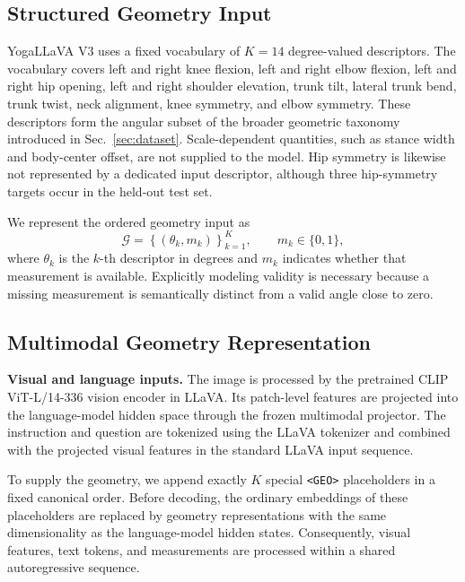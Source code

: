 \subsection{Structured Geometry Input}
\label{sec:structured_geometry_input}

YogaLLaVA V3 uses a fixed vocabulary of $K=14$ degree-valued descriptors.
The vocabulary covers left and right knee flexion, left and right elbow flexion, left and right hip opening, left and right shoulder elevation, trunk tilt, lateral trunk bend, trunk twist, neck alignment, knee symmetry, and elbow symmetry.
These descriptors form the angular subset of the broader geometric taxonomy introduced in Sec.~\ref{sec:dataset}.
Scale-dependent quantities, such as stance width and body-center offset, are not supplied to the model.
Hip symmetry is likewise not represented by a dedicated input descriptor, although three hip-symmetry targets occur in the held-out test set.

We represent the ordered geometry input as
\begin{equation}
    \mathcal{G}
    =
    \left\{(\theta_k,m_k)\right\}_{k=1}^{K},
    \qquad m_k\in\{0,1\},
    \label{eq:geometry_input}
\end{equation}
where $\theta_k$ is the $k$-th descriptor in degrees and $m_k$ indicates whether that measurement is available.
Explicitly modeling validity is necessary because a missing measurement is semantically distinct from a valid angle close to zero.

\subsection{Multimodal Geometry Representation}
\label{sec:geometry_representation}

\noindent\textbf{Visual and language inputs.}
The image is processed by the pretrained CLIP ViT-L/14-336 vision encoder in LLaVA.
Its patch-level features are projected into the language-model hidden space through the frozen multimodal projector.
The instruction and question are tokenized using the LLaVA tokenizer and combined with the projected visual features in the standard LLaVA input sequence.

To supply the geometry, we append exactly $K$ special \texttt{<GEO>} placeholders in a fixed canonical order.
Before decoding, the ordinary embeddings of these placeholders are replaced by geometry representations with the same dimensionality as the language-model hidden states.
Consequently, visual features, text tokens, and measurements are processed within a shared autoregressive sequence.

